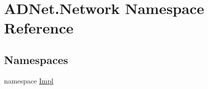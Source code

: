 \hypertarget{namespace_a_d_net_1_1_network}{}\section{A\+D\+Net.\+Network Namespace Reference}
\label{namespace_a_d_net_1_1_network}
\subsection*{Namespaces}
\begin{DoxyCompactItemize}
\item 
namespace \hyperlink{namespace_a_d_net_1_1_network_1_1_impl}{Impl}
\end{DoxyCompactItemize}
